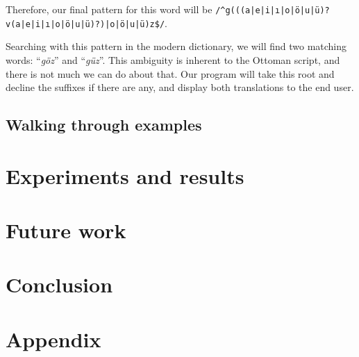 \documentclass[10pt,twocolumn]{article}
\theoremstyle{nonumberplain}
\newcommand{\word}[1]{``\emph{#1}''}
\newcommand{\TODO}[1]{{\color{red}{[TODO: #1]}}}
\begin{document}
Therefore, our final pattern for this word will be
\texttt{/\^{}g(((a|e|i|ı|o|ö|u|ü)?v(a|e|i|ı|o|ö|u|ü)?)|o|ö|u|ü)z\$/}.

Searching with this pattern in the modern dictionary, we will find two matching
words: \word{göz} and \word{güz}. This ambiguity is inherent to the Ottoman
script, and there is not much we can do about that. Our program will take this
root and decline the suffixes if there are any, and display both translations
to the end user.

\subsection{Walking through examples}

\TODO{gotta write}

\section{Experiments and results}

\TODO{gotta write}

\section{Future work}

\TODO{gotta write}

\section{Conclusion}

\TODO{gotta write}




\clearpage
\appendix
\section{Appendix}

\end{document}
